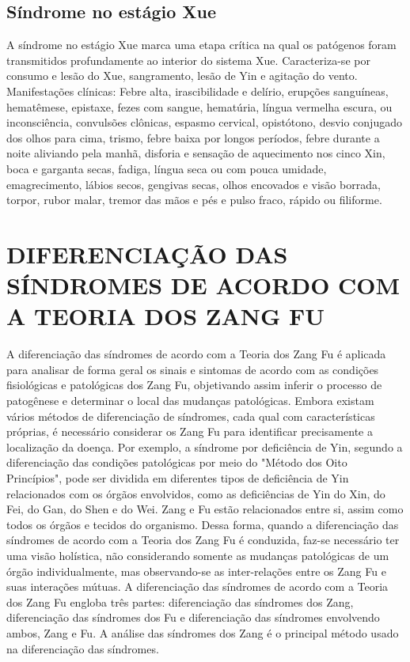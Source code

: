 \documentclass[12pt,oneside,a4paper]{book} %
\begin{document}
\section{Síndrome no estágio Xue}
A síndrome no estágio Xue marca uma etapa crítica na qual os patógenos foram transmitidos profundamente ao interior do sistema Xue. Caracteriza-se por consumo e lesão do Xue, sangramento, lesão de Yin e agitação do vento.
Manifestações clínicas: Febre alta, irascibilidade e delírio, erupções sanguíneas, hematêmese, epistaxe, fezes com sangue, hematúria, língua vermelha escura, ou inconsciência, convulsões clônicas, espasmo cervical, opistótono, desvio conjugado dos olhos para cima, trismo, febre baixa por longos períodos, febre durante a noite aliviando pela manhã, disforia e sensação de aquecimento nos cinco Xin, boca e garganta secas, fadiga, língua seca ou com pouca umidade, emagrecimento, lábios secos, gengivas secas, olhos encovados e visão borrada, torpor, rubor malar, tremor das mãos e pés e pulso fraco, rápido ou filiforme.

\chapter{DIFERENCIAÇÃO DAS SÍNDROMES DE ACORDO COM A TEORIA DOS ZANG FU}

A diferenciação das síndromes de acordo com a Teoria dos Zang Fu é aplicada para analisar de forma geral os sinais e sintomas de acordo com as condições fisiológicas e patológicas dos Zang Fu, objetivando assim inferir o processo de patogênese e determinar o local das mudanças patológicas. Embora existam vários métodos de diferenciação de síndromes, cada qual com características próprias, é necessário considerar os Zang Fu para identificar precisamente a localização da doença. Por exemplo, a síndrome por deficiência de Yin, segundo a diferenciação das condições patológicas por meio do "Método dos Oito Princípios", pode ser dividida em diferentes tipos de deficiência de Yin relacionados com os órgãos envolvidos, como as deficiências de Yin do Xin, do Fei, do Gan, do Shen e do Wei.
Zang e Fu estão relacionados entre si, assim como todos os órgãos e tecidos do organismo. Dessa forma, quando a diferenciação das síndromes de acordo com a Teoria dos Zang Fu é conduzida, faz-se necessário ter uma visão holística, não considerando somente as mudanças patológicas de um órgão individualmente, mas observando-se as inter-relações entre os Zang Fu e suas interações mútuas. A diferenciação das síndromes de acordo com a Teoria dos Zang Fu engloba três partes: diferenciação das síndromes dos Zang, diferenciação das síndromes dos Fu e diferenciação das síndromes envolvendo ambos, Zang e Fu. A análise das síndromes dos Zang é o principal método usado na diferenciação das síndromes. 
\end{document}

